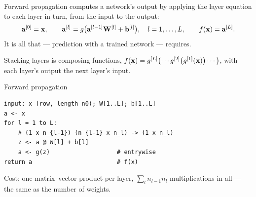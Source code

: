 \begin{defbox}{Forward propagation}
 computes a network's output by applying the layer
equation to each layer in turn, from the input to the output:
\[
  \mathbf{a}^{[0]} = \mathbf{x}, \qquad
  \mathbf{a}^{[l]} = g\bigl(\mathbf{a}^{[l-1]}\mathbf{W}^{[l]} + \mathbf{b}^{[l]}\bigr),\quad l = 1,\dots,L,
  \qquad f(\mathbf{x}) = \mathbf{a}^{[L]} .
\]
It is all that  --- prediction with a trained network --- requires.
\end{defbox}

Stacking layers is composing functions,
$f(\mathbf{x}) = g^{[L]}\bigl(\cdots g^{[2]}\bigl(g^{[1]}(\mathbf{x})\bigr)\cdots\bigr)$,
with each layer's output the next layer's input.

\begin{algorithmbox}{Forward propagation}
\begin{lstlisting}[style=pseudocode]
input: x (row, length n0); W[1..L]; b[1..L]
a <- x
for l = 1 to L:
    # (1 x n_{l-1}) (n_{l-1} x n_l) -> (1 x n_l)
    z <- a @ W[l] + b[l]
    a <- g(z)                   # entrywise
return a                        # f(x)
\end{lstlisting}
Cost: one matrix--vector product per layer, $\sum_l n_{l-1}n_l$ multiplications
in all --- the same as the number of weights.
\end{algorithmbox}

